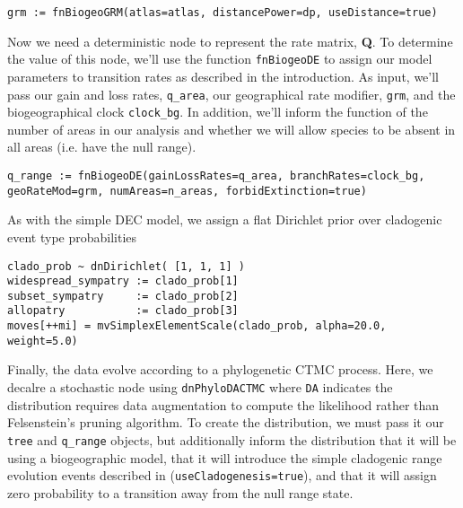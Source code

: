 \begin{snugshade}
\begin{lstlisting}
grm := fnBiogeoGRM(atlas=atlas, distancePower=dp, useDistance=true)
\end{lstlisting}
\end{snugshade}

Now we need a deterministic node to represent the rate matrix, {\bf Q}.
To determine the value of this node, we'll use the function {\tt fnBiogeoDE} to assign our model parameters to transition rates as described in the introduction.
As input, we'll pass our gain and loss rates, {\tt q\_area}, our geographical rate modifier, {\tt grm}, and the biogeographical clock {\tt clock\_bg}.
In addition, we'll inform the function of the number of areas in our analysis and whether we will allow species to be absent in all areas (i.e. have the null range).

\begin{snugshade}
\begin{lstlisting}
q_range := fnBiogeoDE(gainLossRates=q_area, branchRates=clock_bg, geoRateMod=grm, numAreas=n_areas, forbidExtinction=true)
\end{lstlisting}
\end{snugshade}

As with the simple DEC model, we assign a flat Dirichlet prior over cladogenic event type probabilities

\begin{snugshade}
\begin{lstlisting}
clado_prob ~ dnDirichlet( [1, 1, 1] )
widespread_sympatry := clado_prob[1]
subset_sympatry     := clado_prob[2]
allopatry           := clado_prob[3]
moves[++mi] = mvSimplexElementScale(clado_prob, alpha=20.0, weight=5.0)
\end{lstlisting}
\end{snugshade}

Finally, the data evolve according to a phylogenetic CTMC process. Here, we decalre a stochastic node using {\tt dnPhyloDACTMC} where {\tt DA} indicates the distribution requires data augmentation to compute the likelihood rather than Felsenstein's pruning algorithm.
To create the distribution, we must pass it our {\tt tree} and {\tt q\_range} objects, but additionally inform the distribution that it will be using a biogeographic model, that it will introduce the simple cladogenic range evolution events described in \citet{ree08} ({\tt useCladogenesis=true}), and that it will assign zero probability to a transition away from the null range state.

